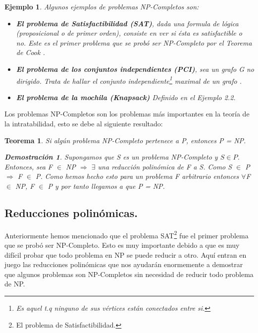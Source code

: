 \documentclass[a4paper,12pt,titlepage]{article}
\newtheorem{eje}{Ejemplo}[section]
\newtheorem{teo}{Teorema}[section]
\newtheorem*{dem}{\textbf{Demostraci\'on}}
\begin{document}
\begin{eje}

Algunos ejemplos de problemas NP-Completos son:

\begin{itemize}

  \item \textbf{El problema de Satisfactibilidad (SAT)}, dada una formula de l\'ogica (proposicional o de primer orden), consiste en ver si \'esta es satisfactible o no. Este es el primer problema que se prob\'o ser NP-Completo por el Teorema de Cook \cite{AroraBarak}.
  \item \textbf{El problema de los conjuntos independientes (PCI)}, sea un grafo G no dirigido. Trata de hallar el conjunto independiente\footnote{Es aquel t.q ninguno de sus v\'ertices est\'an conectados entre si.} maximal de un grafo \cite{approx_core}.
  \item \textbf{El problema de la mochila (Knapsack)} Definido en el Ejemplo 2.2.

\end{itemize}

\end{eje}

Los problemas NP-Completos son los problemas m\'as importantes en la teor\'ia de la intratabilidad, esto se debe al siguiente resultado:

\begin{teo}

Si alg\'un problema NP-Completo pertenece a P, entonces P = NP.

\begin{dem}

Supongamos que S es un problema NP-Completo y $S \in P$. Entonces, sea F $\in$ NP $\Rightarrow$ $\exists$ una reducci\'on polin\'omica de F a S. Como S $\in$ P $\Rightarrow$ F $\in$ P. Como hemos hecho esto para un problema F arbitrario entonces $\forall$F $\in$ NP, F $\in$ P y por tanto llegamos a que P = NP.

\end{dem}

\end{teo}

\subsection{Reducciones polin\'omicas.}\label{red_poli}
\label{reduc1}

Anteriormente hemos mencionado que el problema SAT\footnote{El problema de Satisfactibilidad.} fue el primer problema que se prob\'o ser NP-Completo. Esto es muy importante debido a que es muy dif\'icil probar que todo problema en NP se puede reducir a otro. Aqu\'i entran en juego las reducciones polin\'omicas que nos ayudar\'an enormemente a demostrar que algunos problemas son NP-Completos sin necesidad de reducir todo problema de NP.
\end{document}
